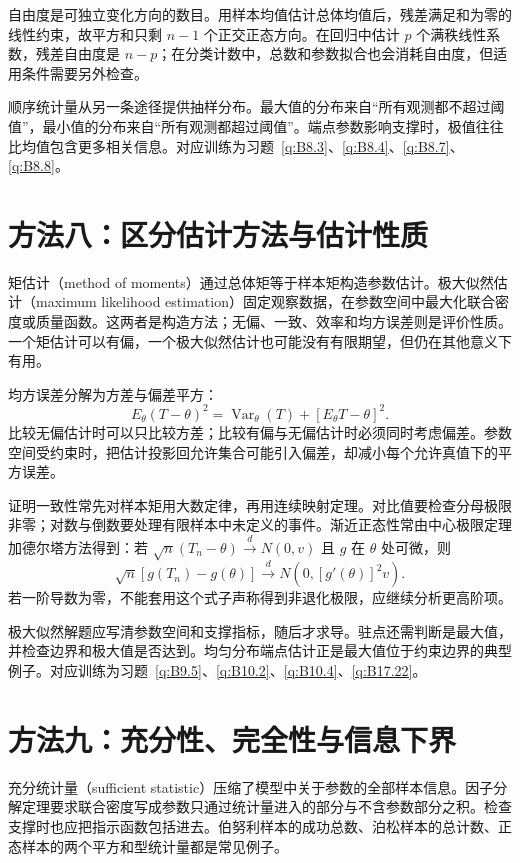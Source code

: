 \documentclass[UTF8,12pt,a4paper,fontset=fandol]{ctexbook}
\begin{document}
自由度是可独立变化方向的数目。用样本均值估计总体均值后，残差满足和为零的线性约束，故平方和只剩 $n-1$ 个正交正态方向。在回归中估计 $p$ 个满秩线性系数，残差自由度是 $n-p$；在分类计数中，总数和参数拟合也会消耗自由度，但适用条件需要另外检查。

顺序统计量从另一条途径提供抽样分布。最大值的分布来自“所有观测都不超过阈值”，最小值的分布来自“所有观测都超过阈值”。端点参数影响支撑时，极值往往比均值包含更多相关信息。对应训练为习题~\ref{q:B8.3}、\ref{q:B8.4}、\ref{q:B8.7}、\ref{q:B8.8}。

\section*{方法八：区分估计方法与估计性质}
矩估计（method of moments）通过总体矩等于样本矩构造参数估计。极大似然估计（maximum likelihood estimation）固定观察数据，在参数空间中最大化联合密度或质量函数。这两者是构造方法；无偏、一致、效率和均方误差则是评价性质。一个矩估计可以有偏，一个极大似然估计也可能没有有限期望，但仍在其他意义下有用。

均方误差分解为方差与偏差平方：
\[
E_\theta(T-\theta)^2=\operatorname{Var}_\theta(T)+[E_\theta T-\theta]^2.
\]
比较无偏估计时可以只比较方差；比较有偏与无偏估计时必须同时考虑偏差。参数空间受约束时，把估计投影回允许集合可能引入偏差，却减小每个允许真值下的平方误差。

证明一致性常先对样本矩用大数定律，再用连续映射定理。对比值要检查分母极限非零；对数与倒数要处理有限样本中未定义的事件。渐近正态性常由中心极限定理加德尔塔方法得到：若 $\sqrt n(T_n-\theta)\xrightarrow dN(0,v)$ 且 $g$ 在 $\theta$ 处可微，则
\[
\sqrt n[g(T_n)-g(\theta)]\xrightarrow dN(0,[g'(\theta)]^2v).
\]
若一阶导数为零，不能套用这个式子声称得到非退化极限，应继续分析更高阶项。

极大似然解题应写清参数空间和支撑指标，随后才求导。驻点还需判断是最大值，并检查边界和极大值是否达到。均匀分布端点估计正是最大值位于约束边界的典型例子。对应训练为习题~\ref{q:B9.5}、\ref{q:B10.2}、\ref{q:B10.4}、\ref{q:B17.22}。

\section*{方法九：充分性、完全性与信息下界}
充分统计量（sufficient statistic）压缩了模型中关于参数的全部样本信息。因子分解定理要求联合密度写成参数只通过统计量进入的部分与不含参数部分之积。检查支撑时也应把指示函数包括进去。伯努利样本的成功总数、泊松样本的总计数、正态样本的两个平方和型统计量都是常见例子。
\end{document}
